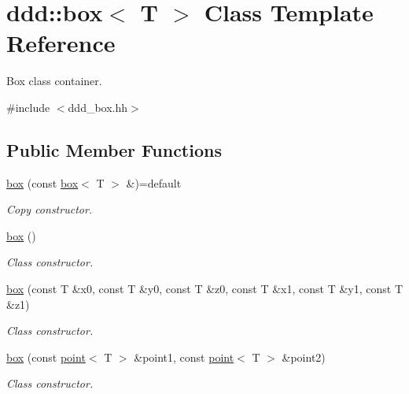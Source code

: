\hypertarget{classddd_1_1box}{}\section{ddd\+:\+:box$<$ T $>$ Class Template Reference}
\label{classddd_1_1box}


Box class container.  




{\ttfamily \#include $<$ddd\+\_\+box.\+hh$>$}

\subsection*{Public Member Functions}
\begin{DoxyCompactItemize}
\item 
\mbox{\label{classddd_1_1box_ae36d1565ad1e59e45329aa15d879017d}} 
\hyperlink{classddd_1_1box_ae36d1565ad1e59e45329aa15d879017d}{box} (const \hyperlink{classddd_1_1box}{box}$<$ T $>$ \&)=default
\begin{DoxyCompactList}\small\item\em Copy constructor. \end{DoxyCompactList}\item 
\mbox{\label{classddd_1_1box_abe0d38e4c4380bf430a4781c8c0ed8f6}} 
\hyperlink{classddd_1_1box_abe0d38e4c4380bf430a4781c8c0ed8f6}{box} ()
\begin{DoxyCompactList}\small\item\em Class constructor. \end{DoxyCompactList}\item 
\mbox{\label{classddd_1_1box_a5f4d57343779a88663aead8580127175}} 
\hyperlink{classddd_1_1box_a5f4d57343779a88663aead8580127175}{box} (const T \&x0, const T \&y0, const T \&z0, const T \&x1, const T \&y1, const T \&z1)
\begin{DoxyCompactList}\small\item\em Class constructor. \end{DoxyCompactList}\item 
\hyperlink{classddd_1_1box_afb3bf0799aac08e5b58dbb955be99a78}{box} (const \hyperlink{classddd_1_1point}{point}$<$ T $>$ \&point1, const \hyperlink{classddd_1_1point}{point}$<$ T $>$ \&point2)
\begin{DoxyCompactList}\small\item\em Class constructor. \end{DoxyCompactList}\item 

\end{DoxyCompactItemize}
